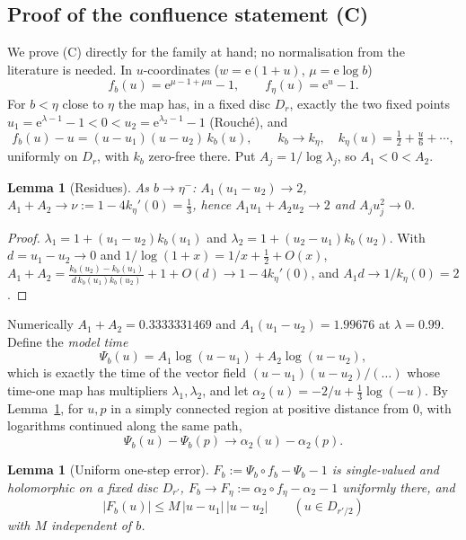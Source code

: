 \documentclass[11pt,a4paper]{article}
\newtheorem{lemma}[theorem]{Lemma}
\theoremstyle{definition}
\newcommand{\eee}{\mathrm{e}}
\begin{document}
\subsection{Proof of the confluence statement (C)}\label{sec:proofC}

We prove (C) directly for the family at hand; no normalisation from the
literature is needed.  In $u$-coordinates ($w=\eee(1+u)$, $\mu=\eee\log b$)
\[
 f_b(u)=\eee^{\mu-1+\mu u}-1,\qquad f_\eta(u)=\eee^u-1 .
\]
For $b<\eta$ close to $\eta$ the map has, in a fixed disc $D_r$, exactly the two
fixed points $u_1=\eee^{\lambda-1}-1<0<u_2=\eee^{\lambda_2-1}-1$ (Rouch\'e), and
\begin{equation}\label{eq:prepared}
 f_b(u)-u=(u-u_1)(u-u_2)\,k_b(u),\qquad k_b\to k_\eta,\quad
 k_\eta(u)=\tfrac12+\tfrac u6+\cdots,
\end{equation}
uniformly on $D_r$, with $k_b$ zero-free there.  Put $A_j=1/\log\lambda_j$,
so $A_1<0<A_2$.

\begin{lemma}[Residues]\label{lem:res}
As $b\to\eta^-$: $A_1(u_1-u_2)\to2$, $A_1+A_2\to\nu:=1-4k_\eta'(0)=\tfrac13$, hence
$A_1u_1+A_2u_2\to2$ and $A_ju_j^2\to0$.
\end{lemma}

\begin{proof}
$\lambda_1=1+(u_1-u_2)k_b(u_1)$ and $\lambda_2=1+(u_2-u_1)k_b(u_2)$.  With
$d=u_1-u_2\to0$ and $1/\log(1+x)=1/x+\tfrac12+O(x)$,
$A_1+A_2=\frac{k_b(u_2)-k_b(u_1)}{d\,k_b(u_1)k_b(u_2)}+1+O(d)\to1-4k_\eta'(0)$,
and $A_1d\to1/k_\eta(0)=2$.
\end{proof}

\noindent
Numerically $A_1+A_2=0.3333331469$ and $A_1(u_1-u_2)=1.99676$ at $\lambda=0.99$.
Define the \emph{model time}
\[
 \Psi_b(u)=A_1\log(u-u_1)+A_2\log(u-u_2),
\]
which is exactly the time of the vector field $(u-u_1)(u-u_2)/(\ldots)$ whose
time-one map has multipliers $\lambda_1,\lambda_2$, and let
$\alpha_2(u)=-2/u+\tfrac13\log(-u)$.  By Lemma~\ref{lem:res}, for $u,p$ in a
simply connected region at positive distance from $0$, with logarithms
continued along the same path,
\begin{equation}\label{eq:psilimit}
 \Psi_b(u)-\Psi_b(p)\longrightarrow\alpha_2(u)-\alpha_2(p).
\end{equation}

\begin{lemma}[Uniform one-step error]\label{lem:F}
$F_b:=\Psi_b\circ f_b-\Psi_b-1$ is single-valued and holomorphic on a fixed disc
$D_{r'}$, $F_b\to F_\eta:=\alpha_2\circ f_\eta-\alpha_2-1$ uniformly there, and
\[
 |F_b(u)|\le M\,|u-u_1|\,|u-u_2|\qquad(u\in D_{r'/2})
\]
with $M$ independent of $b$.
\end{lemma}
\end{document}
